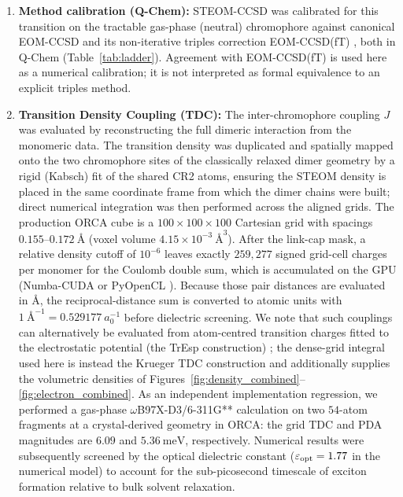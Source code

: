 \documentclass[journal=jpcbfk, manuscript=article, layout=twocolumn, doi=true]{achemso}
\begin{document}
\begin{enumerate}
Figure~\ref{fig:qmregion} gives the atom-resolved chemical structure of the common $44$-atom model used for the embedded and gas-phase electronic-structure comparison.


    \item \textbf{Method calibration (Q-Chem):} STEOM-CCSD was calibrated for this transition on the tractable gas-phase (neutral) chromophore against canonical EOM-CCSD and its non-iterative triples correction EOM-CCSD(fT) \cite{manohar2008ft}, both in Q-Chem \cite{epifanovsky2021qchem} (Table~\ref{tab:ladder}). Agreement with EOM-CCSD(fT) is used here as a numerical calibration; it is not interpreted as formal equivalence to an explicit triples method.

    \item \textbf{Transition Density Coupling (TDC):} The inter-chromophore coupling $J$ was evaluated by reconstructing the full dimeric interaction from the monomeric data. The transition density was duplicated and spatially mapped onto the two chromophore sites of the classically relaxed dimer geometry by a rigid (Kabsch) fit of the shared CR2 atoms, ensuring the STEOM density is placed in the same coordinate frame from which the dimer chains were built; direct numerical integration was then performed across the aligned grids. The production ORCA cube is a $100\times100\times100$ Cartesian grid with spacings $0.155$--$0.172~\text{\AA}$ (voxel volume $4.15\times10^{-3}~\text{\AA}^{3}$). After the link-cap mask, a relative density cutoff of $10^{-6}$ leaves exactly $259{,}277$ signed grid-cell charges per monomer for the Coulomb double sum, which is accumulated on the GPU (Numba-CUDA or PyOpenCL \cite{lam2015numba,klockner2012pycuda}). Because those pair distances are evaluated in \AA, the reciprocal-distance sum is converted to atomic units with $1~\text{\AA}^{-1}=0.529177~a_0^{-1}$ before dielectric screening. We note that such couplings can alternatively be evaluated from atom-centred transition charges fitted to the electrostatic potential (the TrEsp construction) \cite{madjet2006tresp,hsu2009}; the dense-grid integral used here is instead the Krueger TDC construction and additionally supplies the volumetric densities of Figures~\ref{fig:density_combined}--\ref{fig:electron_combined}. As an independent implementation regression, we performed a gas-phase $\omega$B97X-D3/6-311G** calculation on two $54$-atom fragments at a crystal-derived geometry in ORCA: the grid TDC and PDA magnitudes are $6.09$ and $5.36~\mathrm{meV}$, respectively. Numerical results were subsequently screened by the optical dielectric constant ($\varepsilon_{\rm opt}=1.77$ in the numerical model) to account for the sub-picosecond timescale of exciton formation relative to bulk solvent relaxation.
\end{enumerate}
\end{document}
